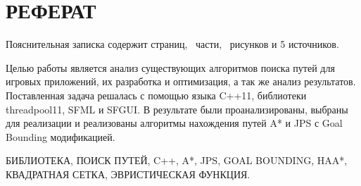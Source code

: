 \section*{РЕФЕРАТ}

\thispagestyle{empty}

Пояснительная записка содержит \pageref{LastPage} страниц, \totalsections\ части, \totalfigures\ рисунков и 5 источников.

\vspace{1\baselineskip}

Целью работы является анализ существующих алгоритмов поиска путей для игровых приложений, их разработка и оптимизация, а так же анализ результатов. Поставленная задача решалась с помощью языка C++11, библиотеки threadpool11, SFML и SFGUI. В результате были проанализированы, выбраны для реализации и реализованы алгоритмы нахождения путей A* и JPS с Goal Bounding модификацией.


БИБЛИОТЕКА, ПОИСК ПУТЕЙ, C++, A*, JPS, GOAL BOUNDING, HAA*, КВАДРАТНАЯ СЕТКА, ЭВРИСТИЧЕСКАЯ ФУНКЦИЯ.